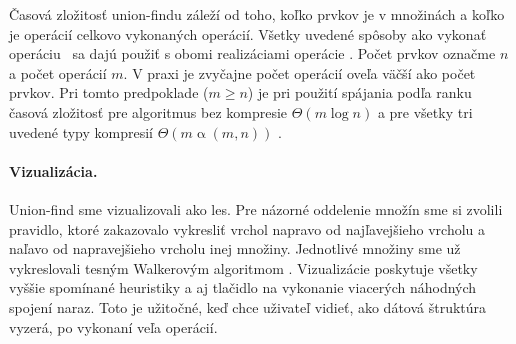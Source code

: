 Časová zložitosť union-findu záleží od toho, koľko prvkov je v množinách a koľko je 
operácií celkovo vykonaných operácií. Všetky uvedené spôsoby ako vykonať 
operáciu \find\ sa dajú použiť s obomi realizáciami operácie \union. 
Počet prvkov označme $n$ a počet operácií $m$. V praxi je zvyčajne počet 
operácií oveľa väčší ako počet prvkov. Pri tomto predpoklade ($m\geq n$) je 
pri použití spájania podľa ranku časová zložitosť pre algoritmus bez kompresie 
$\Theta(m\log n)$ a pre všetky tri uvedené typy kompresií 
$\Theta(m\mathop{\alpha}(m,n))$ \citep{paths2}.

\paragraph{Vizualizácia.} Union-find sme vizualizovali ako les. Pre názorné 
oddelenie množín sme si zvolili pravidlo, ktoré zakazovalo vykresliť vrchol 
napravo od najľavejšieho vrcholu a naľavo od napravejšieho vrcholu inej 
množiny. Jednotlivé množiny sme už vykreslovali tesným Walkerovým algoritmom 
\citep{walker}. Vizualizácie poskytuje všetky vyššie spomínané heuristiky a 
aj tlačidlo na vykonanie viacerých náhodných spojení naraz. Toto je užitočné, 
keď chce uživateľ vidieť, ako dátová štruktúra vyzerá, po vykonaní 
veľa operácií.





